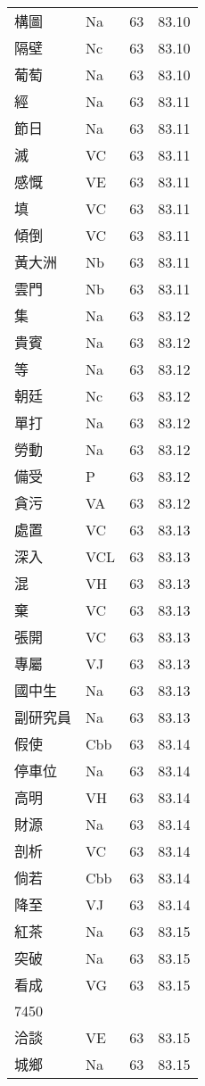 \documentclass[twocolumn]{book}
\begin{document}
\begin{supertabular}{llrr}
構圖 & Na & 63 &  83.10\\
隔壁 & Nc & 63 &  83.10\\
葡萄 & Na & 63 &  83.10\\
經 & Na & 63 &  83.11\\
節日 & Na & 63 &  83.11\\
滅 & VC & 63 &  83.11\\
感慨 & VE & 63 &  83.11\\
填 & VC & 63 &  83.11\\
傾倒 & VC & 63 &  83.11\\
黃大洲 & Nb & 63 &  83.11\\
雲門 & Nb & 63 &  83.11\\
集 & Na & 63 &  83.12\\
貴賓 & Na & 63 &  83.12\\
等 & Na & 63 &  83.12\\
朝廷 & Nc & 63 &  83.12\\
單打 & Na & 63 &  83.12\\
勞動 & Na & 63 &  83.12\\
備受 & P & 63 &  83.12\\
貪污 & VA & 63 &  83.12\\
處置 & VC & 63 &  83.13\\
深入 & VCL & 63 &  83.13\\
混 & VH & 63 &  83.13\\
棄 & VC & 63 &  83.13\\
張開 & VC & 63 &  83.13\\
專屬 & VJ & 63 &  83.13\\
國中生 & Na & 63 &  83.13\\
副研究員 & Na & 63 &  83.13\\
假使 & Cbb & 63 &  83.14\\
停車位 & Na & 63 &  83.14\\
高明 & VH & 63 &  83.14\\
財源 & Na & 63 &  83.14\\
剖析 & VC & 63 &  83.14\\
倘若 & Cbb & 63 &  83.14\\
降至 & VJ & 63 &  83.14\\
紅茶 & Na & 63 &  83.15\\
突破 & Na & 63 &  83.15\\
看成 & VG & 63 &  83.15\\
7450\\
洽談 & VE & 63 &  83.15\\
城鄉 & Na & 63 &  83.15\\

\end{supertabular}
\end{document}
